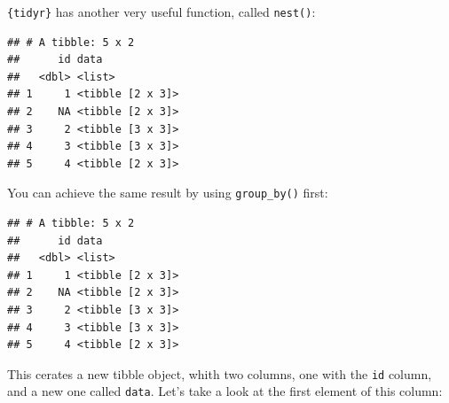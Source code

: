 \documentclass[]{gitbook}
\newenvironment{Shaded}{\begin{snugshade}}{\end{snugshade}}
\newcommand{\DecValTok}[1]{\textcolor[rgb]{0.00,0.00,0.81}{#1}}
\newcommand{\KeywordTok}[1]{\textcolor[rgb]{0.13,0.29,0.53}{\textbf{#1}}}
\newcommand{\NormalTok}[1]{#1}
\newcommand{\OperatorTok}[1]{\textcolor[rgb]{0.81,0.36,0.00}{\textbf{#1}}}
\newcommand{\StringTok}[1]{\textcolor[rgb]{0.31,0.60,0.02}{#1}}
\begin{document}
\texttt{\{tidyr\}} has another very useful function, called \texttt{nest()}:

\begin{Shaded}
\end{Shaded}

\begin{verbatim}
## # A tibble: 5 x 2
##      id data            
##   <dbl> <list>          
## 1     1 <tibble [2 x 3]>
## 2    NA <tibble [2 x 3]>
## 3     2 <tibble [3 x 3]>
## 4     3 <tibble [3 x 3]>
## 5     4 <tibble [2 x 3]>
\end{verbatim}

You can achieve the same result by using \texttt{group\_by()} first:

\begin{Shaded}
\end{Shaded}

\begin{verbatim}
## # A tibble: 5 x 2
##      id data            
##   <dbl> <list>          
## 1     1 <tibble [2 x 3]>
## 2    NA <tibble [2 x 3]>
## 3     2 <tibble [3 x 3]>
## 4     3 <tibble [3 x 3]>
## 5     4 <tibble [2 x 3]>
\end{verbatim}

This cerates a new tibble object, whith two columns, one with the \texttt{id} column, and a new one called
\texttt{data}. Let's take a look at the first element of this column:

\begin{Shaded}
\end{Shaded}
\end{document}
